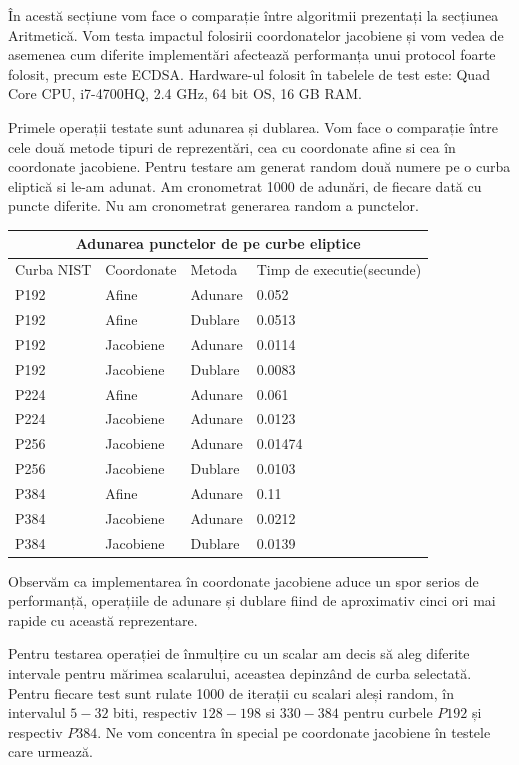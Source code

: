 În acestă secțiune vom face o comparație între algoritmii prezentați la secțiunea Aritmetică. Vom testa impactul folosirii coordonatelor jacobiene și vom vedea de asemenea cum diferite implementări afectează performanța unui protocol foarte folosit, precum este ECDSA. Hardware-ul folosit în tabelele de test este: Quad Core CPU, i7-4700HQ, 2.4 GHz, 64 bit OS, 16 GB RAM.

Primele operații testate sunt adunarea și dublarea. Vom face o comparație între cele două metode tipuri de reprezentări, cea cu coordonate afine si cea în coordonate jacobiene. Pentru testare am generat random două numere pe o curba eliptică si le-am adunat. Am cronometrat 1000 de adunări, de fiecare dată cu puncte diferite. Nu am cronometrat generarea random a punctelor.

\begin{tabular}{ |p{3cm}||p{3cm}|p{3cm}|p{3cm}|  }
 \hline
 \multicolumn{4}{|c|}{Adunarea punctelor de pe curbe eliptice} \\
 \hline
 Curba NIST& Coordonate &Metoda &Timp de executie(secunde)\\
 \hline
 P192   & Afine    &Adunare& 0.052\\
 P192&Afine  & Dublare & 0.0513\\
 P192 &Jacobiene & Adunare& 0.0114\\
 P192&Jacobiene & Dublare & 0.0083\\
 P224& Afine & Adunare & 0.061\\
 P224& Jacobiene & Adunare   & 0.0123\\
 P256& Jacobiene  & Adunare& 0.01474\\
 P256& Jacobiene  & Dublare& 0.0103 \\
 P384& Afine  & Adunare& 0.11\\
 P384& Jacobiene  & Adunare& 0.0212\\
 P384& Jacobiene  & Dublare& 0.0139\\
 \hline
\end{tabular}

Observăm ca implementarea în coordonate jacobiene aduce un spor serios de performanță, operațiile de adunare și dublare fiind de aproximativ cinci ori mai rapide cu această reprezentare.

Pentru testarea operației de înmulțire cu un scalar am decis să aleg diferite intervale pentru mărimea scalarului, aceastea depinzând de curba selectată. Pentru fiecare test sunt rulate 1000 de iterații cu scalari aleși random, în intervalul $5-32$ biti, respectiv $128-198$ si $330-384$ pentru curbele $P192$ și respectiv $P384$. Ne vom concentra în special pe coordonate jacobiene în testele care urmează.


